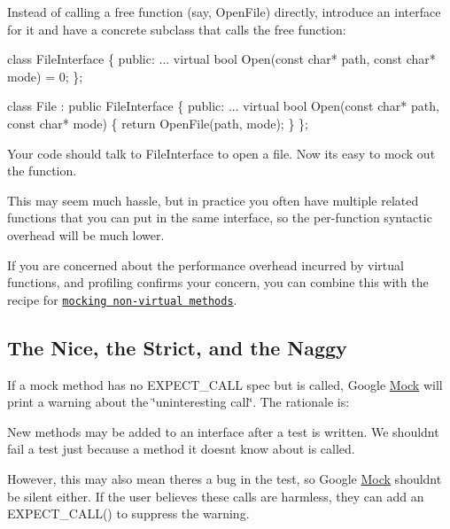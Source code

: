 Instead of calling a free function (say, {\ttfamily Open\+File}) directly, introduce an interface for it and have a concrete subclass that calls the free function\+:


\begin{DoxyCode}
\textcolor{keyword}{class }FileInterface \{
 \textcolor{keyword}{public}:
  ...
  \textcolor{keyword}{virtual} \textcolor{keywordtype}{bool} Open(\textcolor{keyword}{const} \textcolor{keywordtype}{char}* path, \textcolor{keyword}{const} \textcolor{keywordtype}{char}* mode) = 0;
\};

\textcolor{keyword}{class }File : \textcolor{keyword}{public} FileInterface \{
 \textcolor{keyword}{public}:
  ...
  \textcolor{keyword}{virtual} \textcolor{keywordtype}{bool} Open(\textcolor{keyword}{const} \textcolor{keywordtype}{char}* path, \textcolor{keyword}{const} \textcolor{keywordtype}{char}* mode) \{
    \textcolor{keywordflow}{return} OpenFile(path, mode);
  \}
\};
\end{DoxyCode}


Your code should talk to {\ttfamily File\+Interface} to open a file. Now it\textquotesingle{}s easy to mock out the function.

This may seem much hassle, but in practice you often have multiple related functions that you can put in the same interface, so the per-\/function syntactic overhead will be much lower.

If you are concerned about the performance overhead incurred by virtual functions, and profiling confirms your concern, you can combine this with the recipe for \href{#mocking-nonvirtual-methods}{\tt mocking non-\/virtual methods}.

\subsection*{The Nice, the Strict, and the Naggy}

If a mock method has no {\ttfamily E\+X\+P\+E\+C\+T\+\_\+\+C\+A\+LL} spec but is called, Google \hyperlink{classMock}{Mock} will print a warning about the \char`\"{}uninteresting call\char`\"{}. The rationale is\+:


\begin{DoxyItemize}
\item New methods may be added to an interface after a test is written. We shouldn\textquotesingle{}t fail a test just because a method it doesn\textquotesingle{}t know about is called.
\item However, this may also mean there\textquotesingle{}s a bug in the test, so Google \hyperlink{classMock}{Mock} shouldn\textquotesingle{}t be silent either. If the user believes these calls are harmless, they can add an {\ttfamily E\+X\+P\+E\+C\+T\+\_\+\+C\+A\+L\+L()} to suppress the warning.
\end{DoxyItemize}

